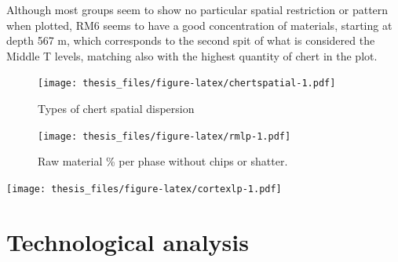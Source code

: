 \documentclass[12pt,twoside]{reedthesis}
\begin{document}
Although most groups seem to show no particular spatial restriction or pattern when plotted, RM6 seems to have a good concentration of materials, starting at depth 567 m, which corresponds to the second spit of what is considered the Middle T levels, matching also with the highest quantity of chert in the plot.
\begin{figure}
\centering
\texttt{[image: thesis\_files/figure-latex/chertspatial-1.pdf]}
\caption{\label{fig:chertspatial}Types of chert spatial dispersion}
\end{figure}
\begin{figure}
\centering
\texttt{[image: thesis\_files/figure-latex/rmlp-1.pdf]}
\caption{\label{fig:rmlp}Raw material \% per phase without chips or shatter.}
\end{figure}
\texttt{[image: thesis\_files/figure-latex/cortexlp-1.pdf]}
\begin{table}

\caption{\label{tab:cortextabtg}Cortex type and localization by raw material (U/Lower T).}
\centering
{}
\end{table}
\begin{table}

\caption{\label{tab:cortextabpr}Cortex type and localization by raw material (Proto-Solutrean).}
\centering
{}
\end{table}
\hypertarget{technological-analysis}{%
\section{Technological analysis}\label{technological-analysis}}
\end{document}
